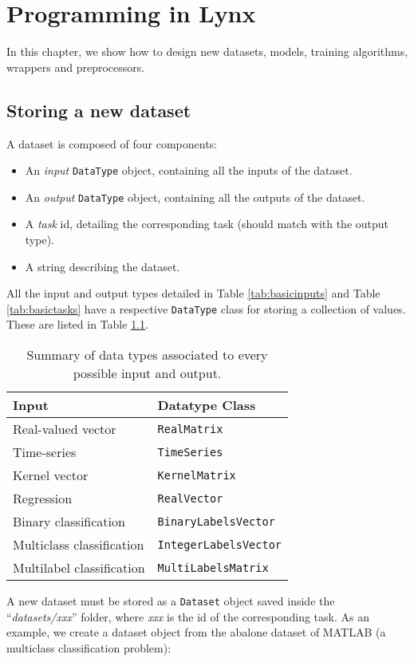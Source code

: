 \chapter{Programming in Lynx}
\label{chap:programminglynx}

In this chapter, we show how to design new datasets, models, training algorithms, wrappers and preprocessors.

\section{Storing a new dataset}

A dataset is composed of four components:

\begin{itemize}
\item An \textit{input} \verb|DataType| object, containing all the inputs of the dataset.
\item An \textit{output} \verb|DataType| object, containing all the outputs of the dataset.
\item A \textit{task} id, detailing the corresponding task (should match with the output type).
\item A string describing the dataset.
\end{itemize}

All the input and output types detailed in Table \ref{tab:basicinputs} and Table \ref{tab:basictasks} have a respective \verb|DataType| class for storing a collection of values. These are listed in Table \ref{tab:datatypes}.
%
\begin{center}
\begin{table}[t]
	{\centering\hfill{}
		\begin{tabular}{p{}p{}}
			\toprule
			Input & Datatype Class \\ 
			\midrule
			Real-valued vector &  \verb|RealMatrix| \\
			Time-series & \verb|TimeSeries| \\
			Kernel vector & \verb|KernelMatrix| \\
			Regression & \verb|RealVector| \\
			Binary classification & \verb|BinaryLabelsVector| \\
			Multiclass classification & \verb|IntegerLabelsVector| \\
			Multilabel classification & \verb|MultiLabelsMatrix| \\
			\bottomrule
		\end{tabular}}
		\hfill{}
		\caption{Summary of data types associated to every possible input and output.}
		\label{tab:datatypes}
	\end{table}
\end{center}
%
\vspace{-2em}
A new dataset must be stored as a \verb|Dataset| object saved inside the ``\textit{datasets/xxx}'' folder, where \textit{xxx} is the id of the corresponding task. As an example, we create a dataset object from the abalone dataset of MATLAB (a multiclass classification problem):

